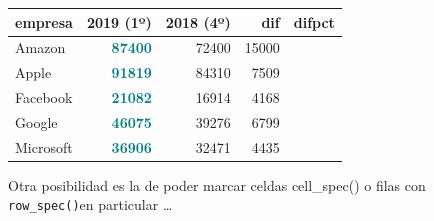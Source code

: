 \documentclass[
]{book}
\newenvironment{Shaded}{\begin{snugshade}}{\end{snugshade}}
\newcommand{\AttributeTok}[1]{\textcolor[rgb]{0.77,0.63,0.00}{#1}}
\newcommand{\ConstantTok}[1]{\textcolor[rgb]{0.00,0.00,0.00}{#1}}
\newcommand{\DecValTok}[1]{\textcolor[rgb]{0.00,0.00,0.81}{#1}}
\newcommand{\FunctionTok}[1]{\textcolor[rgb]{0.00,0.00,0.00}{#1}}
\newcommand{\NormalTok}[1]{#1}
\newcommand{\SpecialCharTok}[1]{\textcolor[rgb]{0.00,0.00,0.00}{#1}}
\newcommand{\StringTok}[1]{\textcolor[rgb]{0.31,0.60,0.02}{#1}}
\begin{document}
\begin{Shaded}
\end{Shaded}

\begin{table}
\centering
\begin{tabular}[t]{l|>{}r|r|r|>{}r}
\hline
empresa & 2019 (1º) & 2018 (4º) & dif & difpct\\
\hline
Amazon & \textcolor{teal}{\textbf{87400}} & 72400 & 15000 & \cellcolor[HTML]{3CB371}{\textcolor{white}{20.7}}\\
\hline
Apple & \textcolor{teal}{\textbf{91819}} & 84310 & 7509 & \cellcolor[HTML]{FA8072}{\textcolor{white}{8.9}}\\
\hline
Facebook & \textcolor{teal}{\textbf{21082}} & 16914 & 4168 & \cellcolor[HTML]{3CB371}{\textcolor{white}{24.6}}\\
\hline
Google & \textcolor{teal}{\textbf{46075}} & 39276 & 6799 & \cellcolor[HTML]{3CB371}{\textcolor{white}{17.3}}\\
\hline
Microsoft & \textcolor{teal}{\textbf{36906}} & 32471 & 4435 & \cellcolor[HTML]{FA8072}{\textcolor{white}{13.7}}\\
\hline
\end{tabular}
\end{table}

Otra posibilidad es la de poder marcar celdas cell\_spec() o filas con \texttt{row\_spec()}en particular \ldots{}
\end{document}
